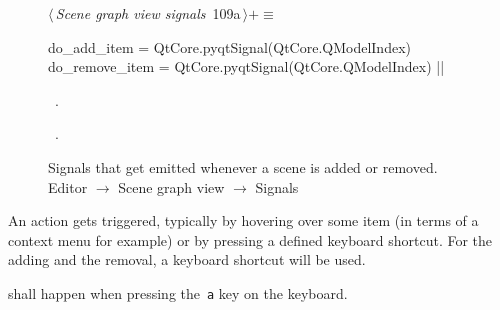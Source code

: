 \documentclass[%
    a4paper,    %
    justified,  %
    nobib,      %
    openany     %
]{tufte-book}
\makeatletter
\renewcommand{\label}[1]{\@tufte@label{##1}}%
\makeatother
\begin{document}
\begin{figure}[!htbp]
\begin{flushleft} \small
\begin{minipage}{\linewidth}\label{scrap45}\raggedright\small
{} $\langle\,${\itshape Scene graph view signals}\nobreak\ {\footnotesize {109a}}$\,\rangle+\equiv$
\vspace{-1ex}
\begin{pythoncode}
do_add_item = QtCore.pyqtSignal(QtCore.QModelIndex)
do_remove_item = QtCore.pyqtSignal(QtCore.QModelIndex)
|\NWsep|
\end{pythoncode}
\vspace{1.5ex}
\footnotesize
\begin{list}{}{\setlength{\itemsep}{-\parsep}\setlength{\itemindent}{-\leftmargin}}
\item \NWtxtMacroDefBy\ .
\item \NWtxtMacroRefIn\ .

\item{}
\end{list}
\end{minipage}\vspace{4ex}
\end{flushleft}
\caption{Signals that get emitted whenever a scene is added or removed.
  \newline{}\newline{}Editor $\rightarrow$ Scene graph view
  $\rightarrow$ Signals}
\end{figure}

An action gets triggered, typically by hovering over some item (in terms of a
context menu for example) or by pressing a defined keyboard shortcut. For the
adding and the removal, a keyboard shortcut will be used.

 shall happen when pressing the~\verb=a= key
on the keyboard.
\end{document}
